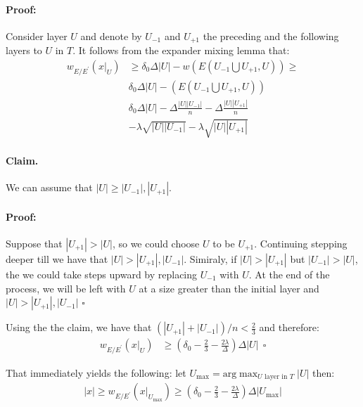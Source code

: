 \documentclass[sigplan,screen]{acmart}
\begin{document}
\begin{multicols*}{2}
  \paragraph{Proof:} Consider layer $U$ and denote by $U_{-1}$ and $U_{+1}$ the preceding and the following layers to $U$ in $T$. It follows from the expander mixing lemma that:
  \begin{equation*}
    \begin{split}
      w_{E/E^{\prime}}\left( x|_{U} \right) & \ge \delta_{0}\Delta|U| -w\left( E(U_{-1} \bigcup U_{+1} ,U)  \right) \ge \\ 
      & \delta_{0}\Delta|U| -\left( E(U_{-1} \bigcup U_{+1} ,U)  \right) \\ 
      &  \delta_{0}\Delta|U| - \Delta\frac{|U||U_{-1}|}{n} - \Delta\frac{|U||U_{+1}|}{n} \\
      & -\lambda\sqrt{|U||U_{-1}|} - \lambda\sqrt{|U||U_{+1}|}
    \end{split}
  \end{equation*}

  \paragraph{Claim.} We can assume that $|U| \ge |U_{-1}|, |U_{+1}|$. 
  \paragraph{Proof:} Suppose that $|U_{+1}| > |U|$, so we could choose $U$ to be $U_{+1}$. Continuing stepping deeper till we have that $|U| > |U_{+1}|, |U_{-1}|$. Simiraly, if $|U| > |U_{+1}|$ but $|U_{-1}| > |U|$, the we could take steps upward by replacing $U_{-1}$ with $U$. At the end of the process, we will be left with $U$ at a size greater than the initial layer and $|U| > |U_{+1}|, |U_{-1}|$ $\square$

  Using the the claim, we have that $\left( |U_{+1}| + |U_{-1}| \right)/n <\frac{2}{3} $ and therefore:
  \begin{equation*}
    \begin{split}
      w_{E/E^{\prime}}\left( x|_{U} \right) & \ge \left( \delta_{0} - \frac{2}{3} - \frac{2\lambda}{\Delta} \right) \Delta |U| \ \  \square 
    \end{split}
  \end{equation*}

  That immediately yields the following: let $U_{\text{max}} = \text{arg} \max_{U \text{ layer in }  T } |U|  $  then: 
  \begin{equation*}
    \begin{split}
      |x| \ge  w_{E/E^{\prime}}\left( x|_{U_{\text{max}}} \right) \ge \left( \delta_{0} - \frac{2}{3} - \frac{2\lambda}{\Delta} \right)\Delta |U_{\text{max}}|
    \end{split}
  \end{equation*}

\end{multicols*}
\end{document}
